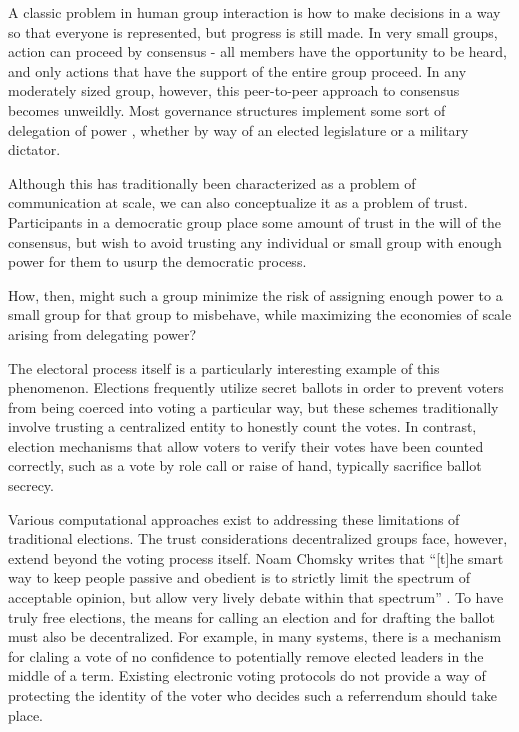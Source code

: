 %
A classic problem in human group interaction is how to make decisions in a way
so that everyone is represented, but progress is still made. In very small
groups, action can proceed by consensus - all members have the opportunity to be
heard, and only actions that have the support of the entire group proceed. In
any moderately sized group, however, this peer-to-peer approach to consensus
becomes unweildly. Most governance structures implement some sort of delegation
of power \tocite, whether by way of an elected legislature or a military
dictator.

Although this has traditionally been characterized as a problem of communication
at scale, we can also conceptualize it as a problem of trust. Participants in a
democratic group place some amount of trust in the will of the consensus, but
wish to avoid trusting any individual or small group with enough power for them
to usurp the democratic process.

How, then, might such a group minimize the risk of assigning enough power to a
small group for that group to misbehave, while maximizing the economies of scale
arising from delegating power?

The electoral process itself is a particularly interesting example of this
phenomenon. Elections frequently utilize secret ballots in order to prevent
voters from being coerced into voting a particular way\tocite, but these schemes
traditionally involve trusting a centralized entity to honestly count the votes.
In contrast, election mechanisms that allow voters to verify their votes have
been counted correctly, such as a vote by role call or raise of hand, typically
sacrifice ballot secrecy\tocite. 

Various computational approaches exist to addressing these limitations of
traditional elections. The trust considerations decentralized groups face,
however, extend beyond the voting process itself. Noam Chomsky writes that
``[t]he smart way to keep people passive and obedient is to strictly limit the
spectrum of acceptable opinion, but allow very lively debate within that
spectrum'' \cite{chomsky1998common}. To have truly free elections, the means for
calling an election and for drafting the ballot must also be decentralized. For
example, in \tocite many systems, there is a mechanism for claling a vote of no
confidence to potentially remove elected
leaders in the middle of a term. Existing electronic voting protocols do not
provide a way of protecting the identity of the voter who decides such a
referrendum should take place.


